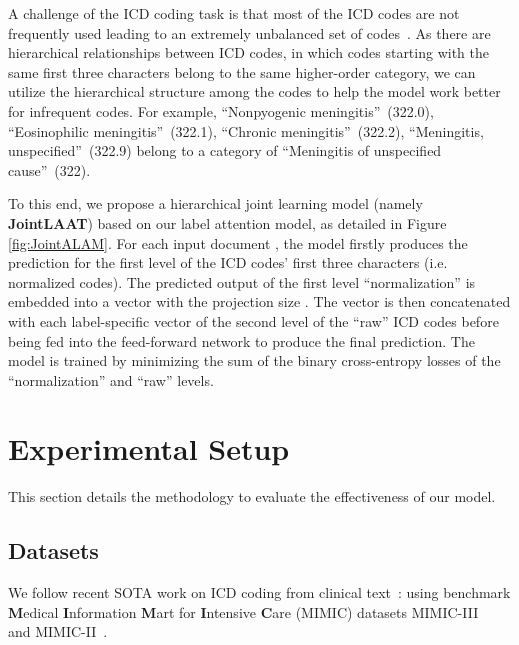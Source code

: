 \documentclass{article}
\begin{document}
A challenge of the ICD coding task is that most of the ICD codes are not frequently used leading to an extremely unbalanced set of codes~\cite{song2019generalized,xie2019ehr}. As there are hierarchical relationships between ICD codes, in which codes starting with the same first three characters belong to the same higher-order category, we can utilize the hierarchical structure among the codes to help the model work better for infrequent codes. For example, ``Nonpyogenic meningitis''~(322.0), ``Eosinophilic meningitis''~(322.1), ``Chronic meningitis''~(322.2), ``Meningitis, unspecified''~(322.9) belong to a category of ``Meningitis of unspecified cause''~(322).

To this end, we propose a hierarchical joint learning model (namely \textbf{JointLAAT}) based on our label attention model,  as detailed in Figure \ref{fig:JointALAM}. For each input document , the model firstly produces the prediction for the first level of the ICD codes' first three characters (i.e. normalized codes). The predicted output of the first level ``normalization'' is embedded into a vector  with the projection size . The vector  is then concatenated with each label-specific vector  of the second level of the ``raw'' ICD codes before being fed into the feed-forward network to produce the final prediction. The model is trained by minimizing the sum of the binary cross-entropy losses of the  ``normalization'' and ``raw'' levels.


\section{Experimental Setup}
This section details the methodology to evaluate the effectiveness of our model.


\subsection{Datasets}
We follow recent SOTA  work on ICD coding from clinical text~\cite{mullenbach2018,xie2019ehr,li2020multirescnn}: using  benchmark \textbf{M}edical \textbf{I}nformation \textbf{M}art for \textbf{I}ntensive \textbf{C}are (MIMIC) datasets  MIMIC-III~\cite{johnson2016mimic} and MIMIC-II~\cite{lee2011open}. 
\end{document}
